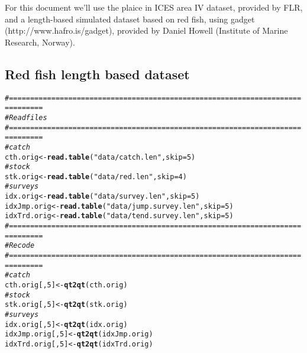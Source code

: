 \documentclass[a4paper,english,10pt]{article}\usepackage[]{graphicx}\usepackage[]{color}
\makeatletter
\newcommand{\hlnum}[1]{\textcolor[rgb]{0.686,0.059,0.569}{#1}}%
\newcommand{\hlstr}[1]{\textcolor[rgb]{0.192,0.494,0.8}{#1}}%
\newcommand{\hlcom}[1]{\textcolor[rgb]{0.678,0.584,0.686}{\textit{#1}}}%
\newcommand{\hlstd}[1]{\textcolor[rgb]{0.345,0.345,0.345}{#1}}%
\newcommand{\hlkwb}[1]{\textcolor[rgb]{0.69,0.353,0.396}{#1}}%
\newcommand{\hlkwc}[1]{\textcolor[rgb]{0.333,0.667,0.333}{#1}}%
\newcommand{\hlkwd}[1]{\textcolor[rgb]{0.737,0.353,0.396}{\textbf{#1}}}%
\newenvironment{kframe}{%
 \def\at@end@of@kframe{}%
 \ifinner\ifhmode%
  \def\at@end@of@kframe{\end{minipage}}%
  \begin{minipage}{\columnwidth}%
 \fi\fi%
 \def\FrameCommand##1{\hskip\@totalleftmargin \hskip-\fboxsep
 \colorbox{shadecolor}{##1}\hskip-\fboxsep
     \hskip-\linewidth \hskip-\@totalleftmargin \hskip\columnwidth}%
 \MakeFramed {\advance\hsize-\width
   \@totalleftmargin\z@ \linewidth\hsize
   \@setminipage}}%
 {\par\unskip\endMakeFramed%
 \at@end@of@kframe}
\newenvironment{knitrout}{}{} %
\makeatother
\begin{document}
For this document we'll use the plaice in ICES area IV dataset, provided by FLR, and a length-based simulated dataset based on red fish, using gadget (http://www.hafro.is/gadget), provided by Daniel Howell (Institute of Marine Research, Norway).

\subsection{Red fish length based dataset}

\begin{knitrout}
\color{fgcolor}\begin{kframe}
\begin{alltt}
\hlcom{# ==============================================================================}
\hlcom{# Read files}
\hlcom{# ==============================================================================}
\hlcom{# catch}
\hlstd{cth.orig} \hlkwb{<-} \hlkwd{read.table}\hlstd{(}\hlstr{"data/catch.len"}\hlstd{,} \hlkwc{skip} \hlstd{=} \hlnum{5}\hlstd{)}
\hlcom{# stock}
\hlstd{stk.orig} \hlkwb{<-} \hlkwd{read.table}\hlstd{(}\hlstr{"data/red.len"}\hlstd{,} \hlkwc{skip} \hlstd{=} \hlnum{4}\hlstd{)}
\hlcom{# surveys}
\hlstd{idx.orig} \hlkwb{<-} \hlkwd{read.table}\hlstd{(}\hlstr{"data/survey.len"}\hlstd{,} \hlkwc{skip} \hlstd{=} \hlnum{5}\hlstd{)}
\hlstd{idxJmp.orig} \hlkwb{<-} \hlkwd{read.table}\hlstd{(}\hlstr{"data/jump.survey.len"}\hlstd{,} \hlkwc{skip} \hlstd{=} \hlnum{5}\hlstd{)}
\hlstd{idxTrd.orig} \hlkwb{<-} \hlkwd{read.table}\hlstd{(}\hlstr{"data/tend.survey.len"}\hlstd{,} \hlkwc{skip} \hlstd{=} \hlnum{5}\hlstd{)}
\hlcom{# ==============================================================================}
\hlcom{# Recode}
\hlcom{# ==============================================================================}
\hlcom{# catch}
\hlstd{cth.orig[,} \hlnum{5}\hlstd{]} \hlkwb{<-} \hlkwd{qt2qt}\hlstd{(cth.orig)}
\hlcom{# stock}
\hlstd{stk.orig[,} \hlnum{5}\hlstd{]} \hlkwb{<-} \hlkwd{qt2qt}\hlstd{(stk.orig)}
\hlcom{# surveys}
\hlstd{idx.orig[,} \hlnum{5}\hlstd{]} \hlkwb{<-} \hlkwd{qt2qt}\hlstd{(idx.orig)}
\hlstd{idxJmp.orig[,} \hlnum{5}\hlstd{]} \hlkwb{<-} \hlkwd{qt2qt}\hlstd{(idxJmp.orig)}
\hlstd{idxTrd.orig[,} \hlnum{5}\hlstd{]} \hlkwb{<-} \hlkwd{qt2qt}\hlstd{(idxTrd.orig)}
\end{alltt}
\end{kframe}
\end{knitrout}
\end{document}
